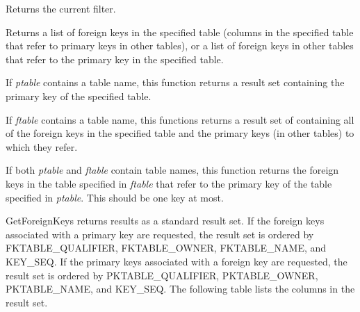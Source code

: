 

Returns the current filter.



Returns a list of foreign keys in the specified table (columns in the
specified table that refer to primary keys in other tables), or
a list of foreign keys in other tables that refer to the primary key in
the specified table.

If {\it ptable} contains a table name, this function returns a result
set containing the primary key of the specified table.

If {\it ftable} contains a table name, this functions returns a result set
of containing all of the foreign keys in the specified table and the
primary keys (in other tables) to which they refer.

If both {\it ptable} and {\it ftable} contain table names, this
function returns the foreign keys in the table specified in {\it
ftable} that refer to the primary key of the table specified in {\it
ptable}. This should be one key at most.

GetForeignKeys returns results as a standard result set. If the foreign
keys associated with a primary key are requested, the result set is
ordered by FKTABLE\_QUALIFIER, FKTABLE\_OWNER, FKTABLE\_NAME, and KEY\_SEQ.
If the primary keys associated with a foreign key are requested, the
result set is ordered by PKTABLE\_QUALIFIER, PKTABLE\_OWNER, PKTABLE\_NAME,
and KEY\_SEQ. The following table lists the columns in the result set. 

\begin{twocollist}\itemsep=0pt
\end{twocollist}


